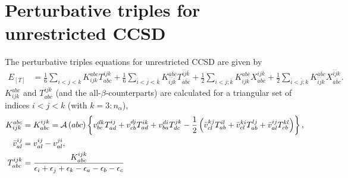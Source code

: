 \documentclass[a4paper,12pt,oneside]{book}
\newcommand{\asop}[1]{{\cal A}\left(#1\right)}
\newcommand{\spa}[1]{{#1}}
\newcommand{\spb}[1]{\bar{#1}}
\newcommand{\half}{\frac{1}{2}}
\begin{document}
\section{Perturbative triples for unrestricted CCSD}
The perturbative triples equations for unrestricted CCSD are given by
\begin{equation}
\begin{aligned}
E_{[T]} &= \frac{1}{6}\sum_{\spa{i}\lt \spa{j}\lt \spa{k}} K^{\spa{a}\spa{b}\spa{c}}_{\spa{i}\spa{j}\spa{k}} T_{\spa{a}\spa{b}\spa{c}}^{\spa{i}\spa{j}\spa{k}}
+\frac{1}{6}\sum_{\spb{i}\lt \spb{j}\lt \spb{k}} K^{\spb{a}\spb{b}\spb{c}}_{\spb{i}\spb{j}\spb{k}} T_{\spb{a}\spb{b}\spb{c}}^{\spb{i}\spb{j}\spb{k}} 
+\frac{1}{2}\sum_{\spa{i}\lt \spa{j}; \spb{k}} K^{\spa{a}\spa{b}\spb{c}}_{\spa{i}\spa{j}\spb{k}} X_{\spa{a}\spa{b}\spb{c}}^{\spa{i}\spa{j}\spb{k}}
+\frac{1}{2}\sum_{\spb{i}\lt \spb{j}; \spa{k}} K^{\spb{a}\spb{b}\spa{c}}_{\spb{i}\spb{j}\spa{k}} X_{\spb{a}\spb{b}\spa{c}}^{\spb{i}\spb{j}\spa{k}}.
\end{aligned}
\end{equation}
$K^{\spa{a}\spa{b}\spa{c}}_{\spa{i}\spa{j}\spa{k}}$ and $T_{\spa{a}\spa{b}\spa{c}}^{\spa{i}\spa{j}\spa{k}}$ (and the all-$\beta$-counterparts) 
are calculated for a triangular set of indices $\spa{i}\lt \spa{j}\lt \spa{k}$ 
(with $\spa{k}=3:n_\alpha$),
\begin{equation}
\begin{aligned}
K^{\spa{a}\spa{b}\spa{c}}_{\spa{i}\spa{j}\spa{k}} &= K_{\spa{a}\spa{b}\spa{c}}^{\spa{i}\spa{j}\spa{k}}
= \asop{\spa{a}\spa{b}\spa{c}} \left\{ 
  v_{\spa{b}\spa{c}}^{\spa{d}\spa{k}} T^{\spa{i}\spa{j}}_{\spa{a}\spa{d}}
+ v_{\spa{c}\spa{b}}^{\spa{d}\spa{j}} T^{\spa{i}\spa{k}}_{\spa{a}\spa{d}}
+ v_{\spa{b}\spa{a}}^{\spa{d}\spa{i}} T^{\spa{j}\spa{k}}_{\spa{d}\spa{c}}
- \half\left(\bar v_{\spa{c}\spa{l}}^{\spa{k}\spa{j}} T^{\spa{i}\spa{l}}_{\spa{a}\spa{b}}
+ \bar v_{\spa{c}\spa{l}}^{\spa{k}\spa{i}} T^{\spa{l}\spa{j}}_{\spa{a}\spa{b}}
+ \bar v_{\spa{a}\spa{l}}^{\spa{i}\spa{j}} T^{\spa{k}\spa{l}}_{\spa{c}\spa{b}}
\right)
\right\},\\
\bar v_{\spa{a}\spa{l}}^{\spa{i}\spa{j}} &= v_{\spa{a}\spa{l}}^{\spa{i}\spa{j}} - v_{\spa{a}\spa{l}}^{\spa{j}\spa{i}},\\
T_{\spa{a}\spa{b}\spa{c}}^{\spa{i}\spa{j}\spa{k}} &= 
\frac{K_{\spa{a}\spa{b}\spa{c}}^{\spa{i}\spa{j}\spa{k}}}
{\epsilon_{\spa{i}} +\epsilon_{\spa{j}} +\epsilon_{\spa{k}} -\epsilon_{\spa{a}} -\epsilon_{\spa{b}} -\epsilon_{\spa{c}}}
\end{aligned}
\end{equation}
\end{document}
